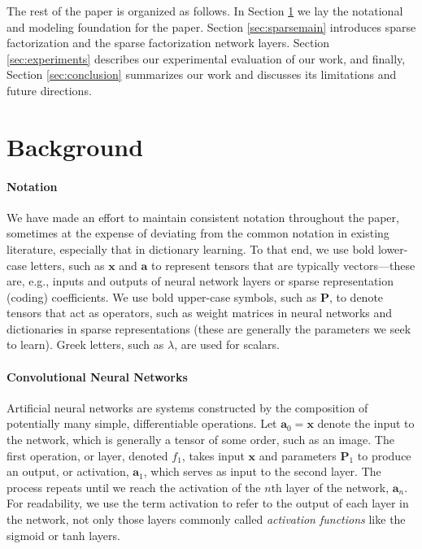 \documentclass[10pt,twocolumn,letterpaper]{article}
\renewcommand{\vec}{\mathbf}
\newcommand{\x}{\vec{x}}
\renewcommand{\P}{\vec{P}}
\renewcommand{\a}{\vec{a}}
\begin{document}
The rest of the paper is organized as follows.  In Section \ref{sec:background} we lay the notational and modeling foundation for the paper.  Section \ref{sec:sparsemain} introduces sparse factorization and the sparse factorization network layers.  Section \ref{sec:experiments} describes our experimental evaluation of our work, and finally, Section \ref{sec:conclusion} summarizes our work and discusses its limitations and future directions.

\section{Background}
\label{sec:background}

\paragraph{Notation}
We have made an effort to maintain consistent notation throughout the paper, sometimes at the expense of deviating from the common notation in existing literature, especially that in dictionary learning.  To that end, we use bold lower-case letters, such as $\x$ and $\a$ to represent tensors that are typically vectors---these are, e.g., inputs and outputs of neural network layers or sparse representation (coding) coefficients.  We use bold upper-case symbols, such as $\P$, to denote tensors that act as operators, such as weight matrices in neural networks and dictionaries in sparse representations (these are generally the parameters we seek to learn).  Greek letters, such as $\lambda$, are used for scalars.

\paragraph{Convolutional Neural Networks}

Artificial neural networks are systems constructed by the composition of potentially many simple, differentiable operations. Let $\a_0 = \x$ denote the input to the network, which is generally a tensor of some order, such as an image.  The first operation, or layer, denoted $f_1$, takes input $\x$ and parameters $\P_1$ to produce an output, or activation, $\a_1$, which serves as input to the second layer.  The process repeats until we reach the activation of the $n$th layer of the network, $\a_n$.  For readability, we use the term activation to refer to the output of each layer in the network, not only those layers commonly called \textit{activation functions} like the sigmoid or tanh layers.
\end{document}
